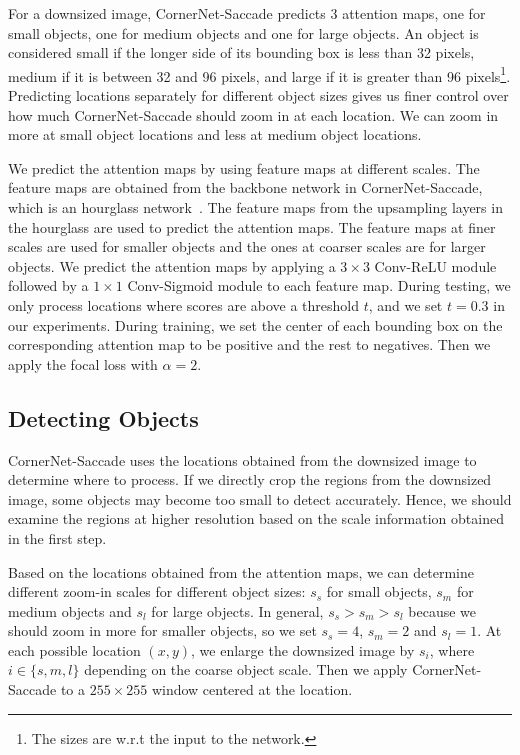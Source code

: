 \documentclass{bmvc2k}
\begin{document}
For a downsized image, CornerNet-Saccade predicts 3 attention maps, one for small objects, one for medium objects and one for large objects. An object is considered small if the longer side of its bounding box is less than 32 pixels, medium if it is between 32 and 96 pixels, and large if it is greater than 96 pixels\footnote{The sizes are w.r.t the input to the network.}. Predicting locations separately for different object sizes gives us finer control over how much CornerNet-Saccade should zoom in at each location. We can zoom in more at small object locations and less at medium object locations.

We predict the attention maps by using feature maps at different scales. The feature maps are obtained from the backbone network in CornerNet-Saccade, which is an hourglass network~\cite{newell2016stacked}. The feature maps from the upsampling layers in the hourglass are used to predict the attention maps. The feature maps at finer scales are used for smaller objects and the ones at coarser scales are for larger objects. We predict the attention maps by applying a $3 \times 3$ Conv-ReLU module followed by a $1 \times 1$ Conv-Sigmoid module to each feature map. During testing, we only process locations where scores are above a threshold $t$, and we set $t = 0.3$ in our experiments. During training, we set the center of each bounding box on the corresponding attention map to be positive and the rest to negatives. Then we apply the focal loss with $\alpha = 2$.

\subsection{Detecting Objects}
CornerNet-Saccade uses the locations obtained from the downsized image to determine where to process. If we directly crop the regions from the downsized image, some objects may become too small to detect accurately. Hence, we should examine the regions at higher resolution based on the scale information obtained in the first step. 

Based on the locations obtained from the attention maps, we can determine different zoom-in scales for different object sizes: $s_s$ for small objects, $s_m$ for medium objects and $s_l$ for large objects. In general, $s_s > s_m > s_l$ because we should zoom in more for smaller objects, so we set $s_s = 4$, $s_m = 2$ and $s_l = 1$. At each possible location $(x, y)$, we enlarge the downsized image by $s_{i}$, where $i \in \{s, m, l\}$ depending on the coarse object scale. Then we apply CornerNet-Saccade to a $255 \times 255$ window centered at the location.
\end{document}
